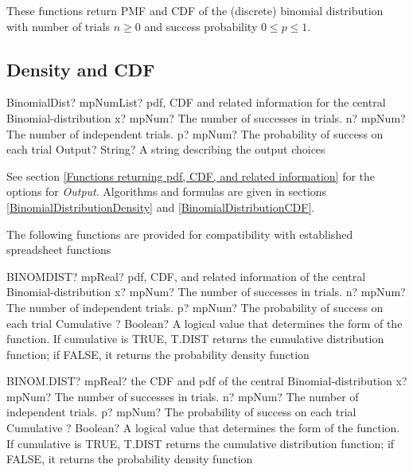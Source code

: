 These functions return PMF and CDF of the (discrete) binomial distribution with
number of trials $n \geq 0$ and success probability $0 \leq p\leq 1$.



\subsection{Density and CDF}

\begin{mpFunctionsExtract}
	\mpFunctionFourNotImplemented
	{BinomialDist? mpNumList? pdf, CDF and related information for the central Binomial-distribution}
	{x? mpNum? The number of successes in trials.}
	{n? mpNum? The number of independent trials.}
	{p? mpNum? The probability of success on each trial}
	{Output? String? A string describing the output choices}
\end{mpFunctionsExtract}


\vspace{0.3cm}
See section \ref{Functions returning pdf, CDF, and related information} for the options for {\itshape\sffamily Output}. Algorithms and formulas are given in sections \ref{BinomialDistributionDensity} and \ref{BinomialDistributionCDF}.


\vspace{0.3cm}

The following functions are provided for compatibility with established spreadsheet functions

\vspace{0.6cm}
\begin{mpFunctionsExtract}
	\mpWorksheetFunctionFourNotImplemented
	{BINOMDIST? mpReal? pdf, CDF, and related information of the central Binomial-distribution}
	{x? mpNum? The number of successes in trials.}
	{n? mpNum? The number of independent trials.}
	{p? mpNum? The probability of success on each trial}
	{Cumulative ? Boolean? A logical value that determines the form of the function. If cumulative is TRUE, T.DIST returns the cumulative distribution function; if FALSE, it returns the probability density function}
\end{mpFunctionsExtract}


\vspace{0.6cm}
\begin{mpFunctionsExtract}
	\mpWorksheetFunctionFourNotImplemented
	{BINOM.DIST? mpReal? the CDF and pdf of the central Binomial-distribution}
	{x? mpNum? The number of successes in trials.}
	{n? mpNum? The number of independent trials.}
	{p? mpNum? The probability of success on each trial}
	{Cumulative ? Boolean? A logical value that determines the form of the function. If cumulative is TRUE, T.DIST returns the cumulative distribution function; if FALSE, it returns the probability density function}
\end{mpFunctionsExtract}


